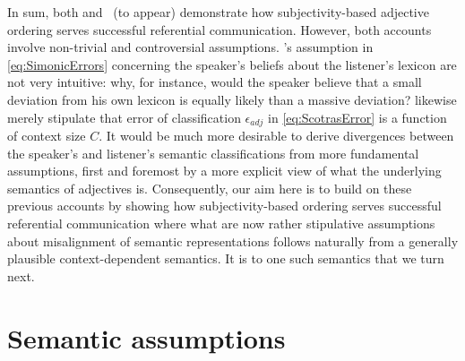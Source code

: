 \documentclass[10pt,a4paper]{article}
\begin{document}
In sum, both  and \citeauthor{scontrasetalSPadjectives}~(to appear) demonstrate how subjectivity-based adjective ordering serves successful referential communication. However, both accounts involve non-trivial and controversial assumptions. \citeauthor{simonic2018}'s assumption in \eqref{eq:SimonicErrors} concerning the speaker's beliefs about the listener's lexicon are not very intuitive: why, for instance, would the speaker believe that a small deviation from his own lexicon is equally likely than a massive deviation?  likewise merely stipulate that error of classification $\epsilon_{adj}$ in \eqref{eq:ScotrasError} is a function of context size $C$. It would be much more desirable to derive divergences between the speaker's and listener's semantic classifications from more fundamental assumptions, first and foremost by a more explicit view of what the underlying semantics of adjectives is. Consequently, our aim here is to build on these previous accounts by showing how subjectivity-based ordering serves successful referential communication where what are now rather stipulative assumptions about misalignment of semantic representations follows naturally from a generally plausible context-dependent semantics. It is to one such semantics that we turn next.



\section{Semantic assumptions}

\end{document}

